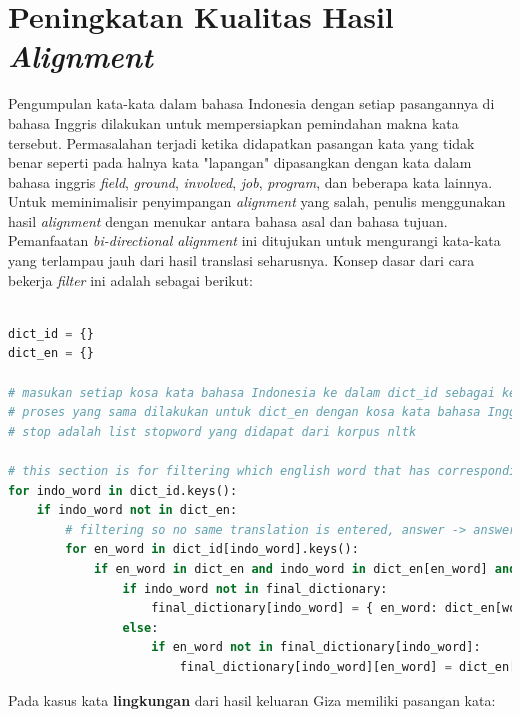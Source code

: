 \section{Peningkatan Kualitas Hasil \textit{Alignment}}
Pengumpulan kata-kata dalam bahasa Indonesia dengan setiap pasangannya di bahasa Inggris dilakukan untuk mempersiapkan pemindahan makna kata tersebut. Permasalahan terjadi ketika didapatkan pasangan kata yang tidak benar seperti pada halnya kata "lapangan" dipasangkan dengan kata dalam bahasa inggris \textit{field}, \textit{ground}, \textit{involved}, \textit{job}, \textit{program}, dan beberapa kata lainnya. Untuk meminimalisir penyimpangan \textit{alignment} yang salah, penulis menggunakan hasil \textit{alignment} dengan menukar antara bahasa asal dan bahasa tujuan. Pemanfaatan \textit{bi-directional alignment} ini ditujukan untuk mengurangi kata-kata yang terlampau jauh dari hasil translasi seharusnya. Konsep dasar dari cara bekerja \textit{filter} ini adalah sebagai berikut:

\begin{lstlisting}[language=Python, caption={Word Alignment Enhancement}, label={word-alignment-enhancement}]

dict_id = {}
dict_en = {}

# masukan setiap kosa kata bahasa Indonesia ke dalam dict_id sebagai key dan kumpulan pasangan kata bahasa inggrisnya sebagai value
# proses yang sama dilakukan untuk dict_en dengan kosa kata bahasa Inggris sebagai key dan kumpulan pasangan kata bahasa Indonesia sebagai value
# stop adalah list stopword yang didapat dari korpus nltk

# this section is for filtering which english word that has corresponding indo translation (bidirectional) from Giza output
for indo_word in dict_id.keys():
	if indo_word not in dict_en:
		# filtering so no same translation is entered, answer -> answer, jawaban -> jawaban
		for en_word in dict_id[indo_word].keys():
			if en_word in dict_en and indo_word in dict_en[en_word] and en_word not in stop:
				if indo_word not in final_dictionary:
					final_dictionary[indo_word] = { en_word: dict_en[word_en][word_id] }
				else:
					if en_word not in final_dictionary[indo_word]:
						final_dictionary[indo_word][en_word] = dict_en[word_en][word_id]
\end{lstlisting}

Pada kasus kata \textbf{lingkungan} dari hasil keluaran Giza memiliki pasangan kata:

